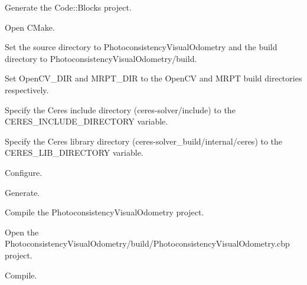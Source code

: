 \begin{DoxyItemize}
\item Generate the Code::Blocks project.
\begin{DoxyEnumerate}
\item Open CMake.
\item Set the source directory to PhotoconsistencyVisualOdometry and the build directory to PhotoconsistencyVisualOdometry/build.
\item Set OpenCV\_\-DIR and MRPT\_\-DIR to the OpenCV and MRPT build directories respectively.
\item Specify the Ceres include directory (ceres-\/solver/include) to the CERES\_\-INCLUDE\_\-DIRECTORY variable.
\item Specify the Ceres library directory (ceres-\/solver\_\-build/internal/ceres) to the CERES\_\-LIB\_\-DIRECTORY variable.
\item Configure.
\item Generate.
\end{DoxyEnumerate}
\end{DoxyItemize}


\begin{DoxyItemize}
\item Compile the PhotoconsistencyVisualOdometry project.
\begin{DoxyEnumerate}
\item Open the PhotoconsistencyVisualOdometry/build/PhotoconsistencyVisualOdometry.cbp project.
\item Compile.
\end{DoxyEnumerate}
\end{DoxyItemize}


